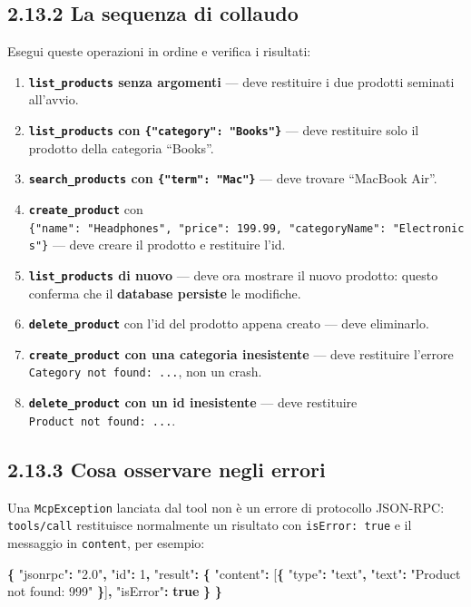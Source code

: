 \documentclass[
  italian,
  10pt,
]{book}
\newenvironment{Shaded}{\begin{snugshade}}{\end{snugshade}}
\newcommand{\DataTypeTok}[1]{\textcolor[rgb]{0.13,0.29,0.53}{#1}}
\newcommand{\DecValTok}[1]{\textcolor[rgb]{0.00,0.00,0.81}{#1}}
\newcommand{\FunctionTok}[1]{\textcolor[rgb]{0.13,0.29,0.53}{\textbf{#1}}}
\newcommand{\KeywordTok}[1]{\textcolor[rgb]{0.13,0.29,0.53}{\textbf{#1}}}
\newcommand{\OtherTok}[1]{\textcolor[rgb]{0.56,0.35,0.01}{#1}}
\newcommand{\StringTok}[1]{\textcolor[rgb]{0.31,0.60,0.02}{#1}}
\providecommand{\tightlist}{%
  \setlength{\itemsep}{0pt}\setlength{\parskip}{0pt}}
\begin{document}
\subsection{2.13.2 La sequenza di
collaudo}\label{la-sequenza-di-collaudo}

Esegui queste operazioni in ordine e verifica i risultati:

\begin{enumerate}
\def\labelenumi{\arabic{enumi}.}
\tightlist
\item
  \textbf{\texttt{list\_products} senza argomenti} --- deve restituire i
  due prodotti seminati all'avvio.
\item
  \textbf{\texttt{list\_products} con \texttt{\{"category":\ "Books"\}}}
  --- deve restituire solo il prodotto della categoria ``Books''.
\item
  \textbf{\texttt{search\_products} con \texttt{\{"term":\ "Mac"\}}} ---
  deve trovare ``MacBook Air''.
\item
  \textbf{\texttt{create\_product}} con
  \texttt{\{"name":\ "Headphones",\ "price":\ 199.99,\ "categoryName":\ "Electronics"\}}
  --- deve creare il prodotto e restituire l'id.
\item
  \textbf{\texttt{list\_products} di nuovo} --- deve ora mostrare il
  nuovo prodotto: questo conferma che il \textbf{database persiste} le
  modifiche.
\item
  \textbf{\texttt{delete\_product}} con l'id del prodotto appena creato
  --- deve eliminarlo.
\item
  \textbf{\texttt{create\_product} con una categoria inesistente} ---
  deve restituire l'errore \texttt{Category\ not\ found:\ ...}, non un
  crash.
\item
  \textbf{\texttt{delete\_product} con un id inesistente} --- deve
  restituire \texttt{Product\ not\ found:\ ...}.
\end{enumerate}

\subsection{2.13.3 Cosa osservare negli
errori}\label{cosa-osservare-negli-errori}

Una \texttt{McpException} lanciata dal tool non è un errore di
protocollo JSON-RPC: \texttt{tools/call} restituisce normalmente un
risultato con \texttt{isError:\ true} e il messaggio in
\texttt{content}, per esempio:

\begin{Shaded}
\begin{Highlighting}[]
\FunctionTok{\{}
  \DataTypeTok{"jsonrpc"}\FunctionTok{:} \StringTok{"2.0"}\FunctionTok{,}
  \DataTypeTok{"id"}\FunctionTok{:} \DecValTok{1}\FunctionTok{,}
  \DataTypeTok{"result"}\FunctionTok{:} \FunctionTok{\{}
    \DataTypeTok{"content"}\FunctionTok{:} \OtherTok{[}\FunctionTok{\{} \DataTypeTok{"type"}\FunctionTok{:} \StringTok{"text"}\FunctionTok{,} \DataTypeTok{"text"}\FunctionTok{:} \StringTok{"Product not found: 999"} \FunctionTok{\}}\OtherTok{]}\FunctionTok{,}
    \DataTypeTok{"isError"}\FunctionTok{:} \KeywordTok{true}
  \FunctionTok{\}}
\FunctionTok{\}}
\end{Highlighting}
\end{Shaded}
\end{document}
